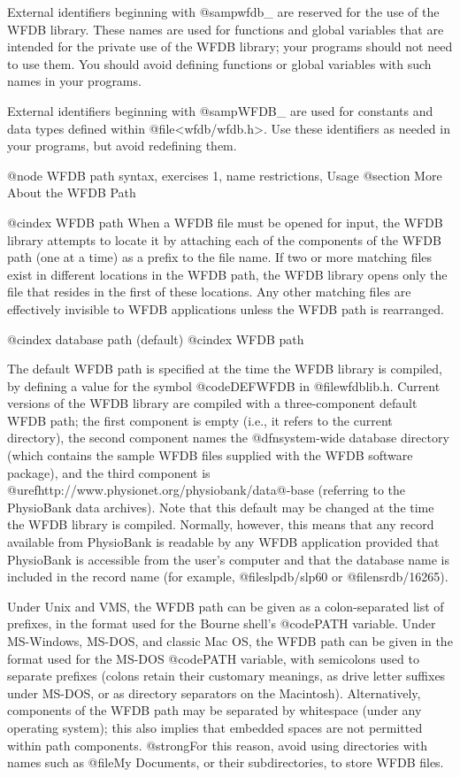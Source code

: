 {{External identifiers beginning with @samp{wfdb_} are reserved for the use
of the WFDB library.  These names are used for functions and global variables
that are intended for the private use of the WFDB library; your programs
should not need to use them.  You should avoid defining functions or
global variables with such names in your programs.

External identifiers beginning with @samp{WFDB_} are used for constants
and data types defined within @file{<wfdb/wfdb.h>}.  Use these identifiers
as needed in your programs, but avoid redefining them.

@node     WFDB path syntax, exercises 1, name restrictions, Usage
@section More About the WFDB Path

@cindex WFDB path
When a WFDB file must be opened for input, the WFDB library attempts to
locate it by attaching each of the components of the WFDB path (one at a
time) as a prefix to the file name.  If two or more matching files exist
in different locations in the WFDB path, the WFDB library opens only the
file that resides in the first of these locations.  Any other matching
files are effectively invisible to WFDB applications unless the WFDB
path is rearranged.

@cindex database path (default)
@cindex WFDB path

The default WFDB path is specified at the time the WFDB library is
compiled, by defining a value for the symbol @code{DEFWFDB} in
@file{wfdblib.h}.  Current versions of the WFDB library are compiled
with a three-component default WFDB path; the first component is empty
(i.e., it refers to the current directory), the second component names
the @dfn{system-wide database directory} (which contains the sample WFDB
files supplied with the WFDB software package), and the third component
is @uref{http://www.physionet.org/physiobank/data@-base} (referring to the
PhysioBank data archives).  Note that this default may be changed at the
time the WFDB library is compiled.  Normally, however, this means that
any record available from PhysioBank is readable by any WFDB application
provided that PhysioBank is accessible from the user's computer and that
the database name is included in the record name (for example,
@file{slpdb/slp60} or @file{nsrdb/16265}).

Under Unix and VMS, the WFDB path can be given as a colon-separated list
of prefixes, in the format used for the Bourne shell's @code{PATH}
variable.  Under MS-Windows, MS-DOS, and classic Mac OS, the WFDB path can be
given in the format used for the MS-DOS @code{PATH} variable, with
semicolons used to separate prefixes (colons retain their customary
meanings, as drive letter suffixes under MS-DOS, or as directory
separators on the Macintosh).  Alternatively, components of the WFDB
path may be separated by whitespace (under any operating system); this
also implies that embedded spaces are not permitted within path
components.  @strong{For this reason, avoid using directories with names
such as @file{My Documents}, or their subdirectories, to store WFDB files.}

}}
